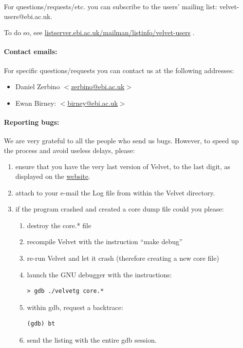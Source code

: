 \documentclass{article}
\begin{document}
For questions/requests/etc. you can subscribe to the users' mailing list: velvet-users@ebi.ac.uk.

To do so, see \href{http://listserver.ebi.ac.uk/mailman/listinfo/velvet-users}{listserver.ebi.ac.uk/mailman/listinfo/velvet-users} .


\paragraph{Contact emails:}

For specific questions/requests you can contact us at the following addresses:
\begin{itemize}
\item Daniel Zerbino $<$\href{mailto:zerbino@ebi.ac.uk}{zerbino@ebi.ac.uk}$>$
\item Ewan Birney: $<$\href{mailto:birney@ebi.ac.uk}{birney@ebi.ac.uk}$>$
\end{itemize}

\paragraph{Reporting bugs:}

We are very grateful to all the people who send us bugs. However, to speed up the process and avoid useless delays, please:
\begin{enumerate}
\item ensure that you have the very last version of Velvet, to the last digit, as displayed on the \href{http://www.ebi.ac.uk/~zerbino/velvet/}{website}.
\item attach to your e-mail the Log file from within the Velvet directory.
\item if the program crashed and created a core dump file could you please:
\begin{enumerate}
\item destroy the core.* file
\item recompile Velvet with the instruction ``make debug''
\item re-run Velvet and let it crash (therefore creating a new core file)
\item launch the GNU debugger with the instructions:
\begin{verbatim}
> gdb ./velvetg core.*
\end{verbatim}
\item within gdb, request a backtrace:
\begin{verbatim}
(gdb) bt
\end{verbatim}
\item send the listing with the entire gdb session.
\end{enumerate}
\end{enumerate}
\end{document}
